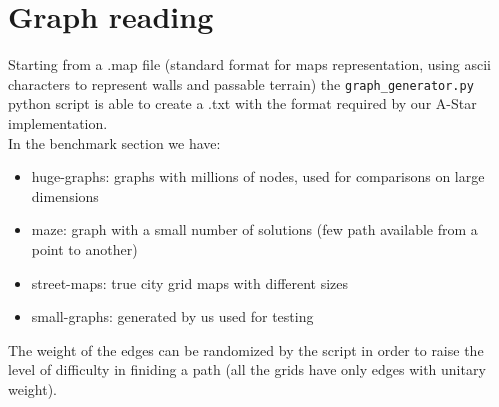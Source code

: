 \section{Graph reading}
\label{Sec:reading}

Starting from a .map file (standard format for maps representation, using ascii characters to represent walls and passable terrain)
the \verb|graph_generator.py| python script is able to create a .txt with the format required by our A-Star implementation. \\
In the benchmark section we have:
\begin{itemize}
	\item huge-graphs: graphs with millions of nodes, used for comparisons on large dimensions
	\item maze: graph with a small number of solutions (few path available from a point to another)
	\item street-maps: true city grid maps with different sizes
	\item small-graphs: generated by us used for testing
\end{itemize}

The weight of the edges can be randomized by the script in order to raise the level of difficulty in finiding a path (all the grids have only edges with unitary weight).
